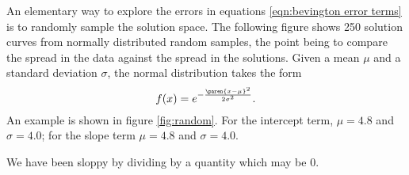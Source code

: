 An elementary way to explore the errors in equations \eqref{eqn:bevington error terms} is to randomly sample the solution space. The following figure shows 250 solution curves from normally distributed random samples, the point being to compare the spread in the data against the spread in the solutions. Given a mean $\mu$ and a standard deviation $\sigma$, the normal distribution takes the form
  \begin{equation}
      f(x) = e^{-\frac{{\paren{x-\mu}^{2}}}{2\sigma^{2}}} .
  \end{equation}
An example is shown in figure \eqref{fig:random}. For the intercept term, $\mu=4.8$ and $\sigma=4.0$; for the slope term $\mu=4.8$ and $\sigma=4.0$.

We have been sloppy by dividing by a quantity which may be 0.

\endinput  %

